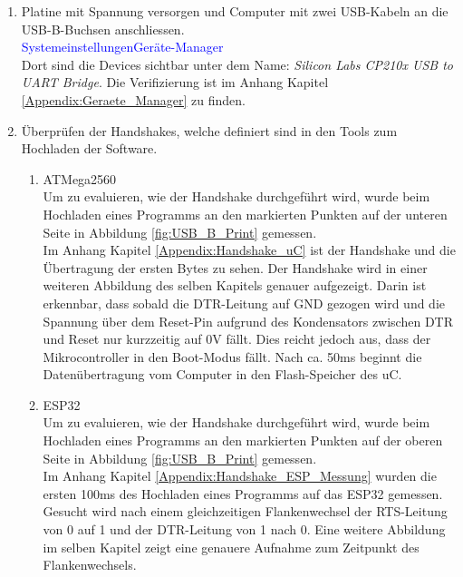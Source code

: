 \begin{enumerate}
\item Platine mit Spannung versorgen und Computer mit zwei USB-Kabeln an die USB-B-Buchsen anschliessen.\\
\textcolor{blue}{Systemeinstellungen\textrightarrow Geräte-Manager}\\
Dort sind die Devices sichtbar unter dem Name: \textit{Silicon Labs CP210x USB to UART Bridge}. Die Verifizierung ist im Anhang Kapitel \ref{Appendix:Geraete_Manager} zu finden.\newline
\item Überprüfen der Handshakes, welche definiert sind in den Tools zum Hochladen der Software.\\

\begin{enumerate}
\item ATMega2560\\

Um zu evaluieren, wie der Handshake durchgeführt wird, wurde beim Hochladen eines Programms an den markierten Punkten auf der unteren Seite in Abbildung \ref{fig:USB_B_Print} gemessen.\\

Im Anhang Kapitel \ref{Appendix:Handshake_uC} ist der Handshake und die Übertragung der ersten Bytes zu sehen. Der Handshake wird in einer weiteren Abbildung des selben Kapitels genauer aufgezeigt. Darin ist erkennbar, dass sobald die DTR-Leitung auf GND gezogen wird und die Spannung über dem Reset-Pin aufgrund des Kondensators zwischen DTR und Reset nur kurzzeitig auf 0V fällt. Dies reicht jedoch aus, dass der Mikrocontroller in den Boot-Modus fällt. Nach ca. 50ms beginnt die Datenübertragung vom Computer in den Flash-Speicher des uC.\\

\item ESP32\\

Um zu evaluieren, wie der Handshake durchgeführt wird, wurde beim Hochladen eines Programms an den markierten Punkten auf der oberen Seite in Abbildung \ref{fig:USB_B_Print} gemessen.\\

Im Anhang Kapitel \ref{Appendix:Handshake_ESP_Messung} wurden die ersten 100ms des Hochladen eines Programms auf das ESP32 gemessen. Gesucht wird nach einem gleichzeitigen Flankenwechsel der RTS-Leitung von 0 auf 1 und der DTR-Leitung von 1 nach 0. Eine weitere Abbildung im selben Kapitel zeigt eine genauere Aufnahme zum Zeitpunkt des Flankenwechsels.


\end{enumerate}
\end{enumerate}
